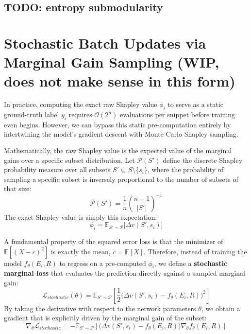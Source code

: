 \documentclass{article}
\begin{document}
\subsection{TODO: entropy submodularity}


\section{Stochastic Batch Updates via Marginal Gain Sampling (WIP, does not make sense in this form)}

In practice, computing the exact raw Shapley value $\phi_i$ to serve as a static ground-truth label $y_i$ requires $\mathcal{O}(2^n)$ evaluations per snippet before training even begins. However, we can bypass this static pre-computation entirely by intertwining the model's gradient descent with Monte Carlo Shapley sampling.

Mathematically, the raw Shapley value is the expected value of the marginal gains over a specific subset distribution. Let $\mathcal{P}(S')$ define the discrete Shapley probability measure over all subsets $S' \subseteq S \setminus \{s_i\}$, where the probability of sampling a specific subset is inversely proportional to the number of subsets of that size:
$$ \mathcal{P}(S') = \frac{1}{n} \binom{n-1}{\vert S' \vert}^{-1} $$
The exact Shapley value is simply this expectation:
$$ \phi_i = \mathbb{E}_{S' \sim \mathcal{P}} \big[ \Delta v(S', s_i) \big] $$

A fundamental property of the squared error loss is that the minimizer of $\mathbb{E}[(X - c)^2]$ is exactly the mean, $c = \mathbb{E}[X]$. Therefore, instead of training the model $f_\theta(E_i, R)$ to regress on a pre-computed $\phi_i$, we define a \textbf{stochastic marginal loss} that evaluates the prediction directly against a sampled marginal gain:
$$ \mathcal{L}_{stochastic}(\theta) = \mathbb{E}_{S' \sim \mathcal{P}} \left[ \frac{1}{2} \Big( \Delta v(S', s_i) - f_\theta(E_i, R) \Big)^2 \right] $$
By taking the derivative with respect to the network parameters $\theta$, we obtain a gradient that is explicitly driven by the marginal gain of the subset:
$$ \nabla_\theta \mathcal{L}_{stochastic} = - \mathbb{E}_{S' \sim \mathcal{P}} \left[ \Big( \Delta v(S', s_i) - f_\theta(E_i, R) \Big) \nabla_\theta f_\theta(E_i, R) \right] $$
\end{document}

